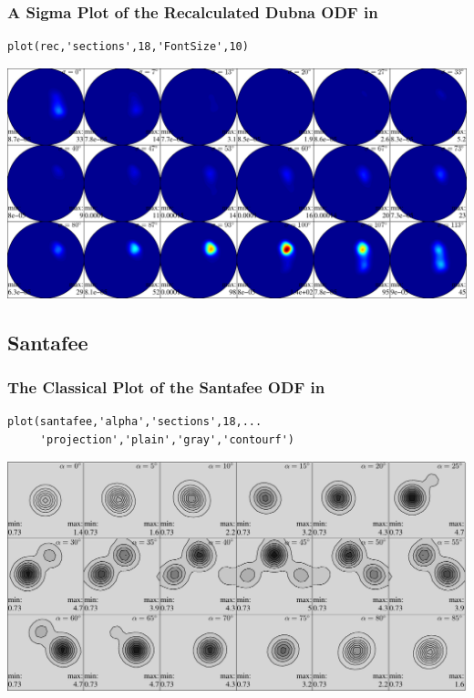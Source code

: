 \begin{frame}[fragile]
  \frametitle{A Sigma Plot of the Recalculated Dubna ODF in \MTEX}

\begin{lstlisting}
plot(rec,'sections',18,'FontSize',10)
\end{lstlisting}

\medskip

\includegraphics[width=\textwidth]{pic/ODFso9}

\end{frame}

\subsection*{Santafee}

\begin{frame}[fragile]
  \frametitle{The Classical Plot of the Santafee ODF in \MTEX}

\begin{lstlisting}
plot(santafee,'alpha','sections',18,...
     'projection','plain','gray','contourf')
\end{lstlisting}

\includegraphics[width=\textwidth]{pic/santafee}

\end{frame}

